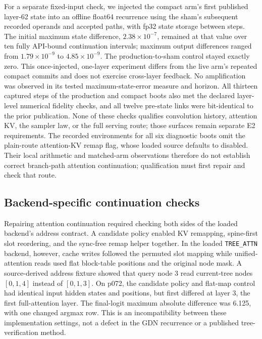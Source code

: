 \documentclass[conference]{IEEEtran}
\begin{document}
For a separate fixed-input check, we injected the compact arm's first published layer-62 state into an offline float64 recurrence using the sham's subsequent recorded operands and accepted paths, with fp32 state storage between steps. The initial maximum state difference, $2.38\times10^{-7}$, remained at that value over ten fully API-bound continuation intervals; maximum output differences ranged from $1.79\times10^{-9}$ to $4.85\times10^{-9}$. The production-to-sham control stayed exactly zero. This once-injected, one-layer experiment differs from the live arm's repeated compact commits and does not exercise cross-layer feedback. No amplification was observed in its tested maximum-state-error measure and horizon. All thirteen captured steps of the production and compact boots also met the declared layer-level numerical fidelity checks, and all twelve pre-state links were bit-identical to the prior publication. None of these checks qualifies convolution history, attention KV, the sampler law, or the full serving route; those surfaces remain separate E2 requirements. The recorded environments for all six diagnostic boots omit the plain-route attention-KV remap flag, whose loaded source defaults to disabled. Their local arithmetic and matched-arm observations therefore do not establish correct branch-path attention continuation; qualification must first repair and check that route.

\subsection{Backend-specific continuation checks}
\label{sec:selected-route}
Repairing attention continuation required checking both sides of the loaded backend's address contract. A candidate policy enabled KV remapping, spine-first slot reordering, and the sync-free remap helper together. In the loaded \texttt{TREE\_ATTN} backend, however, cache writes followed the permuted slot mapping while unified-attention reads used flat block-table positions and the original node mask. A source-derived address fixture showed that query node 3 read current-tree nodes $[0,1,4]$ instead of $[0,1,3]$. On p072, the candidate policy and flat-map control had identical input hidden states and positions, but first differed at layer 3, the first full-attention layer. The final-logit maximum absolute difference was 6.125, with one changed argmax row. This is an incompatibility between these implementation settings, not a defect in the GDN recurrence or a published tree-verification method.
\end{document}
